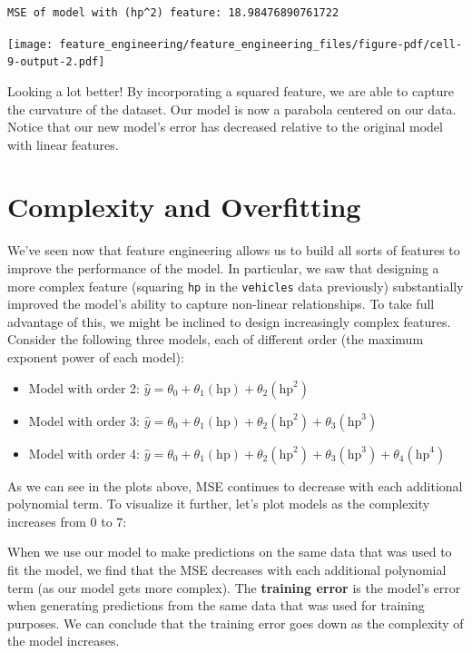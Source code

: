\documentclass[
  letterpaper,
  DIV=11,
  numbers=noendperiod]{scrreprt}
\providecommand{\tightlist}{%
  \setlength{\itemsep}{0pt}\setlength{\parskip}{0pt}}\usepackage{longtable,booktabs,array}
\begin{document}
\begin{verbatim}
MSE of model with (hp^2) feature: 18.98476890761722
\end{verbatim}

\texttt{[image: feature\_engineering/feature\_engineering\_files/figure-pdf/cell-9-output-2.pdf]}

Looking a lot better! By incorporating a squared feature, we are able to
capture the curvature of the dataset. Our model is now a parabola
centered on our data. Notice that our new model's error has decreased
relative to the original model with linear features.

\section{Complexity and Overfitting}\label{complexity-and-overfitting}

We've seen now that feature engineering allows us to build all sorts of
features to improve the performance of the model. In particular, we saw
that designing a more complex feature (squaring \texttt{hp} in the
\texttt{vehicles} data previously) substantially improved the model's
ability to capture non-linear relationships. To take full advantage of
this, we might be inclined to design increasingly complex features.
Consider the following three models, each of different order (the
maximum exponent power of each model):

\begin{itemize}
\tightlist
\item
  Model with order 2:
  \(\hat{y} = \theta_0 + \theta_1 (\text{hp}) + \theta_2 (\text{hp}^2)\)
\item
  Model with order 3:
  \(\hat{y} = \theta_0 + \theta_1 (\text{hp}) + \theta_2 (\text{hp}^2) + \theta_3 (\text{hp}^3)\)
\item
  Model with order 4:
  \(\hat{y} = \theta_0 + \theta_1 (\text{hp}) + \theta_2 (\text{hp}^2) + \theta_3 (\text{hp}^3) + \theta_4 (\text{hp}^4)\)
\end{itemize}

As we can see in the plots above, MSE continues to decrease with each
additional polynomial term. To visualize it further, let's plot models
as the complexity increases from 0 to 7:

When we use our model to make predictions on the same data that was used
to fit the model, we find that the MSE decreases with each additional
polynomial term (as our model gets more complex). The \textbf{training
error} is the model's error when generating predictions from the same
data that was used for training purposes. We can conclude that the
training error goes down as the complexity of the model increases.
\end{document}
